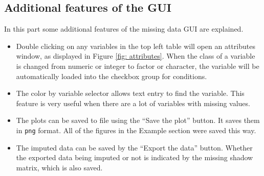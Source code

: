 \documentclass[article]{jss}
\begin{document}
\subsection{Additional features of the GUI}
In this part some additional features of the missing data GUI are explained.
\begin{itemize}
\item Double clicking on any variables in the top left table will open an attributes window, as displayed in Figure \ref{fig: attributes}. When the class of a variable is changed from numeric or integer to factor or character, the variable will be automatically loaded into the checkbox group for conditions.
\item The color by variable selector allows text entry to find the variable.
This feature is very useful when there are a lot 
of variables with missing values.
%

\item The plots can be saved to file using the ``Save the plot'' button. It saves them in \texttt{png} format. All of the figures in the Example section were saved this way.
\item The imputed data can be saved by the ``Export the data'' button. Whether the exported data being imputed or not is indicated by the missing shadow matrix, which is also saved. 
\end{itemize}
%

\end{document}
